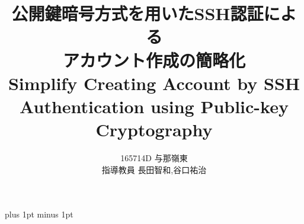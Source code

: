 \documentclass[a4j,12pt]{jreport}
\title{
公開鍵暗号方式を用いたSSH認証による\\
アカウント作成の簡略化\\
Simplify Creating Account by %
SSH Authentication using Public-key Cryptography
}
\author{165714D 与那嶺東  \\ 指導教員 {長田智和,谷口祐治} }
\begin{document}
\maketitle
\baselineskip 17pt plus 1pt minus 1pt

\setcounter{page}{0}

\tableofcontents	%
\listoffigures		%
\listoftables		%










%







%
\end{document}

